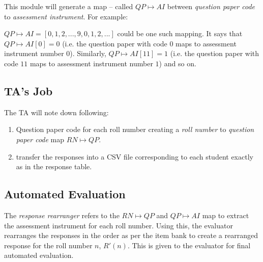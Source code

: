 \documentclass[12pt]{article}
\begin{document}
This module will generate a map -- called $QP\mapsto AI$ between \emph{question paper code} to \emph{assessment instrument}. For example:

$QP\mapsto AI = [0, 1, 2, ..., 9, 0, 1, 2, ...]$ could be one such mapping. It says that $QP\mapsto AI[0] = 0$ (i.e. the question paper with code $0$ maps to assessment instrument number $0$). Similarly, $QP\mapsto AI[11] = 1$ (i.e. the question paper with code $11$ maps to assessment instrument number $1$) and so on.

\subsection{TA's Job}
The TA will note down following:
\begin{enumerate}
\item Question paper code for each roll number creating a \emph{roll number} to \emph{question paper code} map $RN\mapsto QP$.
\item transfer the responses into a CSV file corresponding to each student exactly as in the response table.
\end{enumerate}

\subsection{Automated Evaluation}
The \emph{response rearranger} refers to the $RN\mapsto QP$ and $QP\mapsto AI$ map to extract the assessment instrument for each roll number. Using this, the evaluator rearranges the responses in the order as per the item bank to create a rearranged response for the roll number $n$, $R'(n)$. This is given to the evaluator for final automated evaluation.
\end{document}
